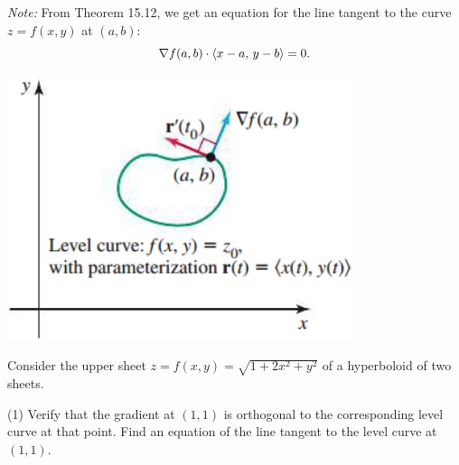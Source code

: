 \documentclass[mathNotesPreamble]{subfiles}
\begin{document}
  \noindent

  \noindent
  \begin{minipage}{0.6\linewidth}

    \textit{Note:} From Theorem 15.12, we get an equation for the line tangent to the curve $z=f(x,y)$ at $(a,b)$:
      \[\nabla f(a,b)\cdot{\left\langle x-a,\,y-b \right\rangle}=0.\]
  \end{minipage}%
  \begin{minipage}{0.3\linewidth}
    \begin{flushright}
      \includegraphics[width=\linewidth]{images/briggs_15_05/fig15_53}
    \end{flushright}
  \end{minipage}

  \begin{ex*}
    Consider the upper sheet $z=f(x,y)=\sqrt{1+2x^2+y^2}$ of a hyperboloid of two sheets.
  \end{ex*}
  \begin{tasks}[after-item-skip=\stretch{1}, label=](1)
    \task Verify that the gradient at $(1,1)$ is orthogonal to the corresponding level curve at that point.
    \task Find an equation of the line tangent to the level curve at $(1,1)$.
  \end{tasks}
\end{document}
